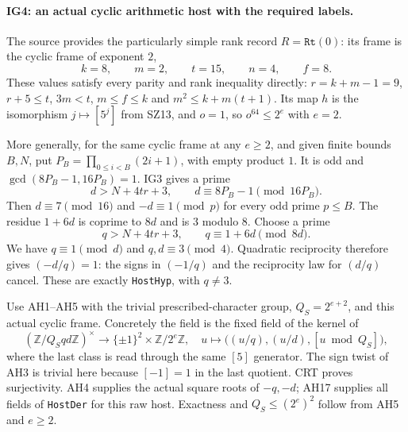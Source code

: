 \paragraph{IG4: an actual cyclic arithmetic host with the required labels.}
The source provides the particularly simple rank record
$R=\texttt{Rt}(0)$: its frame is the cyclic frame of exponent $2$,
\[
       k=8,\qquad m=2,\qquad t=15,\qquad n=4,\qquad f=8.
                                                               \tag{IG.13}
\]
These values satisfy every parity and rank inequality directly:
$r=k+m-1=9$, $r+5\le t$, $3m<t$, $m\le f\le k$ and
$m^2\le k+m(t+1)$. Its map $h$ is the isomorphism
$j\mapsto[5^j]$ from SZ13, and $o=1$, so $o^{64}\le2^e$
with $e=2$.

More generally, for the same cyclic frame at any $e\ge2$, and
given finite bounds $B,N$, put
$P_B=\prod_{0\le i<B}(2i+1)$, with empty product $1$.
It is odd and
$\gcd(8P_B-1,16P_B)=1$. IG3 gives a prime
\[
 d>N+4tr+3,\qquad d\equiv8P_B-1\pmod {16P_B}.
                                                               \tag{IG.14}
\]
Then $d\equiv7\pmod {16}$ and $-d\equiv1\pmod p$ for
every odd prime $p\le B$. The residue $1+6d$ is coprime to
$8d$ and is $3$ modulo $8$. Choose a prime
\[
 q>N+4tr+3,\qquad q\equiv1+6d\pmod {8d}.             \tag{IG.15}
\]
We have $q\equiv1\pmod d$ and $q,d\equiv3\pmod4$.
Quadratic reciprocity therefore gives $(-d/q)=1$:
the signs in $(-1/q)$ and the reciprocity law for $(d/q)$
cancel. These are exactly \texttt{HostHyp}, with $q\ne3$.

Use AH1--AH5 with the trivial prescribed-character group,
$Q_S=2^{e+2}$, and this actual cyclic frame. Concretely the field
is the fixed field of the kernel of
\[
 (\mathbb Z/Q_Sqd\mathbb Z)^\times\longrightarrow
       \{\pm1\}^2\times\mathbb Z/2^e\mathbb Z,
 \quad u\longmapsto\bigl((u/q),(u/d),[u\bmod Q_S]\bigr),
                                                               \tag{IG.16}
\]
where the last class is read through the same $[5]$ generator.
The sign twist of AH3 is trivial here because $[-1]=1$ in the
last quotient. CRT proves surjectivity. AH4 supplies the actual
square roots of $-q,-d$; AH17 supplies all fields of
\texttt{HostDer} for this raw host. Exactness and
$Q_S\le(2^e)^2$ follow from AH5 and $e\ge2$.

